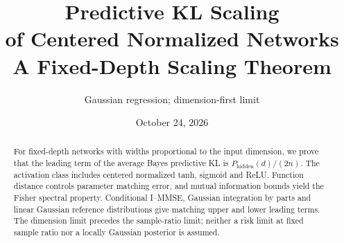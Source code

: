 \documentclass[a4paper]{tufte-handout}
\title[Predictive KL Scaling of Centered Normalized Networks]{\texorpdfstring{Predictive KL Scaling\\of Centered Normalized Networks\\A Fixed-Depth Scaling Theorem}{Predictive KL Scaling of Centered Normalized Networks: A Fixed-Depth Scaling Theorem}}
\author{Gaussian regression; dimension-first limit}
\date{October 24, 2026}
\newcommand{\Pall}{P_{\mathrm{hidden}}}
\begin{document}
\maketitle
\begin{abstract}
For fixed-depth networks with widths proportional to the input dimension, we prove that the leading term of the average Bayes predictive KL is $\Pall(d)/(2n)$. The activation class includes centered normalized tanh, sigmoid and ReLU. Function distance controls parameter matching error, and mutual information bounds yield the Fisher spectral property. Conditional I--MMSE, Gaussian integration by parts and linear Gaussian reference distributions give matching upper and lower leading terms. The dimension limit precedes the sample-ratio limit; neither a risk limit at fixed sample ratio nor a locally Gaussian posterior is assumed.
\end{abstract}
\end{document}
